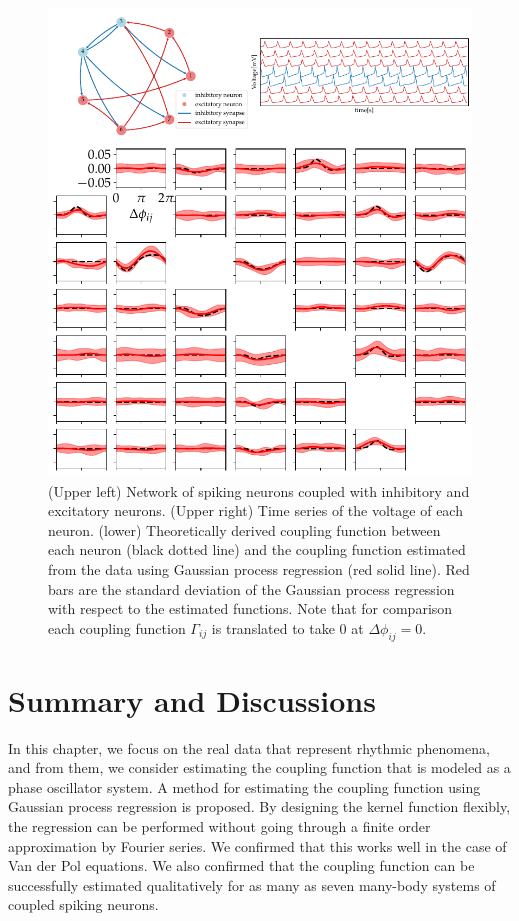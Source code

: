 \begin{figure}[htbp]
    \centering
    \includegraphics[width=\textwidth]{figs/snn.pdf}
    \caption{(Upper left) Network of spiking neurons coupled with inhibitory and excitatory neurons. (Upper right) Time series of the voltage of each neuron. (lower) Theoretically derived coupling function between each neuron (black dotted line) and the coupling function estimated from the data using Gaussian process regression (red solid line). Red bars are the standard deviation of the Gaussian process regression with respect to the estimated functions.
    Note that for comparison each coupling function $\Gamma_{ij}$ is translated to take $0$ at $\Delta\phi_{ij}=0$.}
    \label{fig:snn}
\end{figure}

\section{Summary and Discussions}
\label{sec:paper06_conclusion}
In this chapter, we focus on the real data that represent rhythmic phenomena, and from them, we consider estimating the coupling function that is modeled as a phase oscillator system. A method for estimating the coupling function using Gaussian process regression is proposed. By designing the kernel function flexibly, the regression can be performed without going through a finite order approximation by Fourier series. We confirmed that this works well in the case of Van der Pol equations. We also confirmed that the coupling function can be successfully estimated qualitatively for as many as seven many-body systems of coupled spiking neurons.


